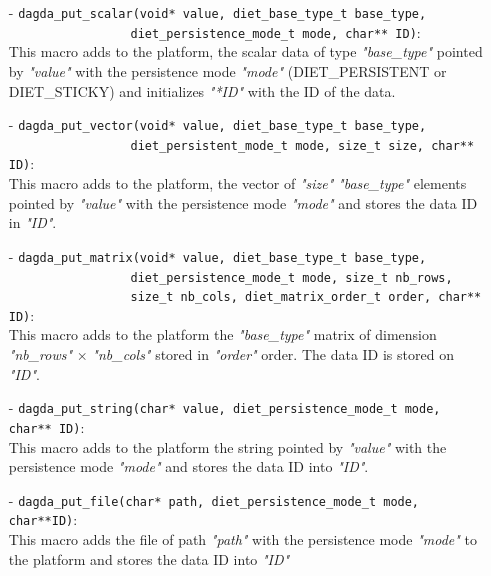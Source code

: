 \begin{itemize}
  \item[-] \verb#dagda_put_scalar(void* value, diet_base_type_t base_type,#\\
           \verb#                 diet_persistence_mode_t mode, char** ID)#:\\
           This macro adds to the platform, the scalar data of type
           \textit{"base\_type"} pointed by \textit{"value"} with the
           persistence mode \textit{"mode"} (DIET\_PERSISTENT or DIET\_STICKY)
           and initializes \textit{"*ID"} with the ID of the data.
  \item[-] \verb#dagda_put_vector(void* value, diet_base_type_t base_type,#\\
           \verb#                 diet_persistent_mode_t mode, size_t size, char** ID)#:\\
           This macro adds to the platform, the vector of \textit{"size"}
           \textit{"base\_type"} elements pointed by \textit{"value"} with the
           persistence mode \textit{"mode"} and stores the data ID in
           \textit{"ID"}.
  \item[-] \verb#dagda_put_matrix(void* value, diet_base_type_t base_type,#\\
         \verb#                 diet_persistence_mode_t mode, size_t nb_rows,#\\
         \verb#                 size_t nb_cols, diet_matrix_order_t order, char** ID)#:\\
           This macro adds to the platform the \textit{"base\_type"} matrix of
           dimension \textit{"nb\_rows"} $\times$ \textit{"nb\_cols"} stored in
           \textit{"order"} order. The data ID is stored on \textit{"ID"}.
  \item[-] \verb#dagda_put_string(char* value, diet_persistence_mode_t mode, char** ID)#:\\
           This macro adds to the platform the string pointed by
           \textit{"value"} with the persistence mode \textit{"mode"} and
           stores the data ID into \textit{"ID"}.
  \item[-] \verb#dagda_put_file(char* path, diet_persistence_mode_t mode, char**ID)#:\\
           This macro adds the file of path \textit{"path"} with the persistence
           mode \textit{"mode"} to the platform and stores the data ID into
           \textit{"ID"}
 \end{itemize}

